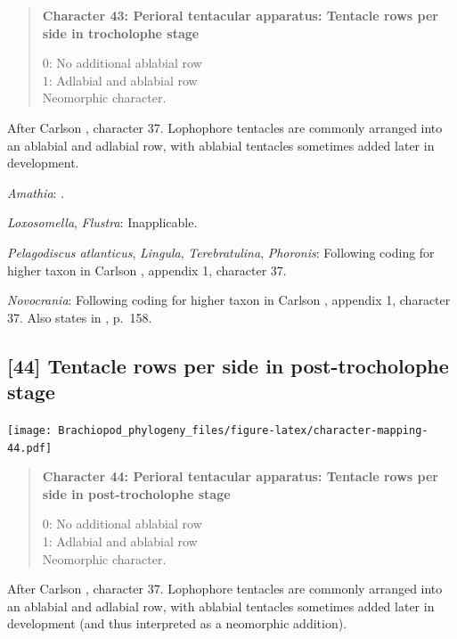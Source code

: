 \documentclass[openany]{book}
\begin{document}
\begin{quote}
\textbf{Character 43: Perioral tentacular apparatus: Tentacle rows per
side in trocholophe stage}

0: No additional ablabial row\\
1: Adlabial and ablabial row\\
Neomorphic character.
\end{quote}

After Carlson \citeyearpar{Carlson1995Phylogeneticrelationships},
character 37. Lophophore tentacles are commonly arranged into an
ablabial and adlabial row, with ablabial tentacles sometimes added later
in development.

\hypertarget{Amathia-coding-43}{}
\emph{Amathia}: \citep{Temereva2016Thenervous}.

\hypertarget{Flustra-coding-43}{}
\emph{Loxosomella}, \emph{Flustra}: Inapplicable.

\hypertarget{Lingula-coding-43}{}
\emph{Pelagodiscus atlanticus}, \emph{Lingula}, \emph{Terebratulina},
\emph{Phoronis}: Following coding for higher taxon in Carlson
\citeyearpar{Carlson1995Phylogeneticrelationships}, appendix 1,
character 37.

\hypertarget{Novocrania-coding-43}{}
\emph{Novocrania}: Following coding for higher taxon in Carlson
\citeyearpar{Carlson1995Phylogeneticrelationships}, appendix 1,
character 37. Also states in
\citet{Williams2000LinguliformeaCraniiformea}, p.~158.

\subsection*{{[}44{]} Tentacle rows per side in post-trocholophe
stage}\label{tentacle-rows-per-side-in-post-trocholophe-stage}

\texttt{[image: Brachiopod\_phylogeny\_files/figure-latex/character-mapping-44.pdf]}

\begin{quote}
\textbf{Character 44: Perioral tentacular apparatus: Tentacle rows per
side in post-trocholophe stage}

0: No additional ablabial row\\
1: Adlabial and ablabial row\\
Neomorphic character.
\end{quote}

After Carlson \citeyearpar{Carlson1995Phylogeneticrelationships},
character 37. Lophophore tentacles are commonly arranged into an
ablabial and adlabial row, with ablabial tentacles sometimes added later
in development (and thus interpreted as a neomorphic addition).
\end{document}
